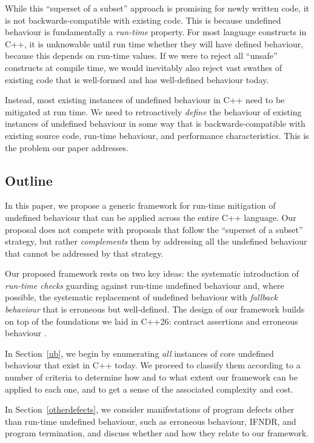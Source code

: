 While this ``superset of a subset'' approach is promising for newly written code, it is not backwards-compatible with existing code. This is because undefined behaviour is fundamentally a \emph{run-time} property. For most language constructs in C++, it is unknowable until run time whether they will have defined behaviour, because this depends on run-time values. If we were to reject all ``unsafe'' constructs at compile time, we would inevitably also reject vast swathes of existing code that is well-formed and has well-defined behaviour today.

Instead, most existing instances of undefined behaviour in C++ need to be mitigated at run time. We need to retroactively \emph{define} the behaviour of existing instances of undefined behaviour in some way that is backwards-compatible with existing source code, run-time behaviour, and performance characteristics. This is the problem our paper addresses.

\subsection{Outline}

In this paper, we propose a generic framework for run-time mitigation of undefined behaviour that can be applied across the entire C++ language. Our proposal does not compete with proposals that follow the ``superset of a subset'' strategy, but rather \emph{complements} them by addressing all the undefined behaviour that cannot be addressed by that strategy.

Our proposed framework rests on two key ideas: the systematic introduction of \emph{run-time checks} guarding against run-time undefined behaviour and, where possible, the systematic replacement of undefined behaviour with \emph{fallback behaviour} that is erroneous but well-defined. The design of our framework builds on top of the foundations we laid in C++26: contract assertions \cite{P2900R14} and erroneous behaviour \cite{P2795R5}. 

In Section~\ref{ub}, we begin by enumerating \emph{all} instances of core undefined behaviour that exist in C++ today. We proceed to classify them according to a number of criteria to determine how and to what extent our framework can be applied to each one, and to get a sense of the associated complexity and cost. 

In Section~\ref{otherdefects}, we consider manifestations of program defects other than run-time undefined behaviour, such as erroneous behaviour, IFNDR, and program termination, and discuss whether and how they relate to our framework.

